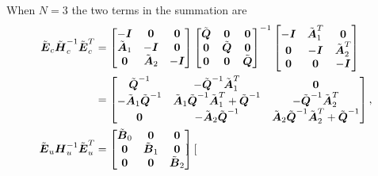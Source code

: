 When $N = 3$ the two terms in the summation are
\begin{align*}
\tilde{\mbm{E}}_c\tilde{\mbm{H}}_c^{-1}\tilde{\mbm{E}}_c^T 
&= 
    \begin{bmatrix} 
      -\mbm{I}    &  \mbm{0}    &  \mbm{0}         \\
       \tilde{\mbm{A}}_1 & -\mbm{I}    &  \mbm{0}  \\
       \mbm{0}    &  \tilde{\mbm{A}}_2 & -\mbm{I}  \\
    \end{bmatrix}
    \begin{bmatrix} 
      \tilde{\mbm{Q}} & \mbm{0}    & \mbm{0}    \\
      \mbm{0}    & \tilde{\mbm{Q}} & \mbm{0}    \\
      \mbm{0}    & \mbm{0}    & \tilde{\mbm{Q}} \\
    \end{bmatrix}^{-1}
    \begin{bmatrix} 
      -\mbm{I} &  \tilde{\mbm{A}}^T_1 &  \mbm{0}             \\
       \mbm{0} & -\mbm{I}             &  \tilde{\mbm{A}}^T_2 \\
       \mbm{0} &  \mbm{0}             & -\mbm{I}             \\
    \end{bmatrix}\\
&= 
  \begin{bmatrix} 
    \tilde{\mbm{Q}}^{-1}    &  -\tilde{\mbm{Q}}^{-1}\tilde{\mbm{A}}^T_1    &  \mbm{0}\\
    -\tilde{\mbm{A}}_1\tilde{\mbm{Q}}^{-1} & \tilde{\mbm{A}}_1\tilde{\mbm{Q}}^{-1}\tilde{\mbm{A}}^T_1 + \tilde{\mbm{Q}}^{-1}   &  -\tilde{\mbm{Q}}^{-1}\tilde{\mbm{A}}^T_2 \\
    \mbm{0}    &  -\tilde{\mbm{A}}_2\tilde{\mbm{Q}}^{-1} & \tilde{\mbm{A}}_2\tilde{\mbm{Q}}^{-1}\tilde{\mbm{A}}^T_2 + \tilde{\mbm{Q}}^{-1}\\
  \end{bmatrix},\\
%
%
\tilde{\mbm{E}}_u\mbm{H}_u^{-1}\tilde{\mbm{E}}_u^T 
&=
    \begin{bmatrix} 
      \tilde{\mbm{B}}_0 & \mbm{0}    & \mbm{0}   \\
      \mbm{0}    & \tilde{\mbm{B}}_1 & \mbm{0}   \\
      \mbm{0}    & \mbm{0}    & \tilde{\mbm{B}}_2\\
    \end{bmatrix}
  \begin{bmatrix} 

\end{bmatrix}
\end{align*}
